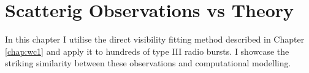 \doublespacing
\chapter{Scatterig Observations vs Theory}
\label{chap:wc2}
In this chapter I utilise the direct visibility fitting method described in Chapter \ref{chap:wc1} and apply it to hundreds of type III radio bursts. I showcase the striking similarity between these observations and computational modelling. 